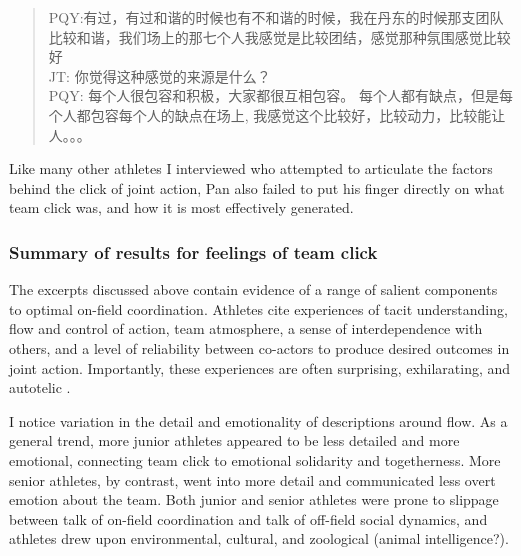 \begin{CJK}{UTF8}{gbsn}
  \begin{quote}
    PQY:有过，有过和谐的时候也有不和谐的时候，我在丹东的时候那支团队比较和谐，我们场上的那七个人我感觉是比较团结，感觉那种氛围感觉比较好 \\
    JT: 你觉得这种感觉的来源是什么？\\
    PQY: 每个人很包容和积极，大家都很互相包容。 每个人都有缺点，但是每个人都包容每个人的缺点在场上, 我感觉这个比较好，比较动力，比较能让人。。。
  \end{quote}

Like many other athletes I interviewed who attempted to articulate the factors behind the click of joint action, Pan also failed to put his finger directly on what team click was, and how it is most effectively generated.

\subsubsection{Summary of results for feelings of team click}

The excerpts discussed above contain evidence of a range of salient components to optimal on-field coordination.  Athletes cite experiences of tacit understanding, flow and control of action, team atmosphere, a sense of interdependence with others, and a level of reliability between co-actors to produce desired outcomes in joint action.  Importantly, these experiences are often surprising, exhilarating, and autotelic \citep{Csikszentmihalyi1990}.

I notice variation in the detail and emotionality of descriptions around flow. As a general trend, more junior athletes appeared to be less detailed and more emotional, connecting team click to emotional solidarity and togetherness.  More senior athletes, by contrast, went into more detail and communicated less overt emotion about the team.  Both junior and senior athletes were prone to slippage between talk of on-field coordination and talk of off-field social dynamics, and athletes drew upon environmental, cultural, and zoological (animal intelligence?).


\end{CJK}
